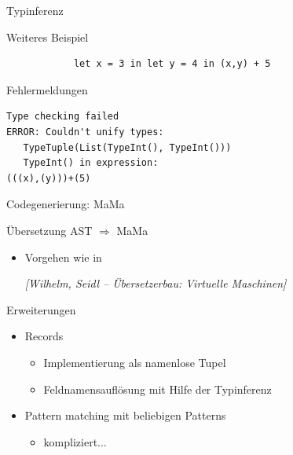 \documentclass[hyperref={pdfpagelabels=false}]{beamer}
\begin{document}
\begin{frame}[fragile]{Typinferenz}
  \begin{block}{Weiteres Beispiel}
      \begin{verbatim}
            let x = 3 in let y = 4 in (x,y) + 5
      \end{verbatim}
  \end{block}
  \begin{alertblock}{Fehlermeldungen}
  \begin{verbatim}
Type checking failed
ERROR: Couldn't unify types: 
   TypeTuple(List(TypeInt(), TypeInt()))
   TypeInt() in expression: 
(((x),(y)))+(5)
  \end{verbatim}
  \end{alertblock}
\end{frame}

\begin{frame}{Codegenerierung: MaMa}
  \begin{block}{Übersetzung AST $\Longrightarrow$ MaMa}
    \begin{itemize}
      \item Vorgehen wie in
        \begin{center}
          \emph{[Wilhelm, Seidl -- Übersetzerbau: Virtuelle Maschinen]}
        \end{center}
    \end{itemize}
  \end{block}
  \begin{block}{Erweiterungen}
    \begin{itemize}
      \item Records        
        \begin{itemize}
          \item Implementierung als namenlose Tupel
          \item Feldnamensauflösung mit Hilfe der Typinferenz
        \end{itemize}
	 \item Pattern matching mit beliebigen Patterns        
        \begin{itemize}
          \item \pause kompliziert$\ldots$
        \end{itemize}
    \end{itemize}
  \end{block}
\end{frame}
\end{document}
